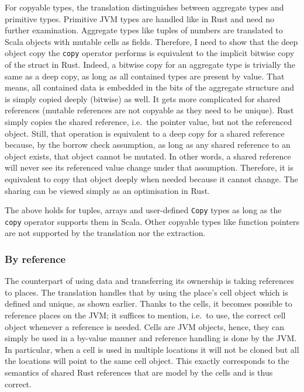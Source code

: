 For copyable types, the translation distinguishes between aggregate types and
primitive types. Primitive JVM types are handled like in Rust and need no
further examination. Aggregate types like tuples of numbers are translated to
Scala objects with mutable cells as fields. Therefore, I need to show that the
deep object copy the \lstinline!copy! operator performs is equivalent to the
implicit bitwise copy of the struct in Rust. Indeed, a bitwise copy for an
aggregate type is trivially the same as a deep copy, as long as all contained
types are present by value. That means, all contained data is embedded in the
bits of the aggregate structure and is simply copied deeply (bitwise) as well.
It gets more complicated for shared references (mutable references are not
copyable as they need to be unique). Rust simply copies the shared reference,
i.e.~the pointer value, but not the referenced object. Still, that operation is
equivalent to a deep copy for a shared reference because, by the borrow check
assumption, as long as any shared reference to an object exists, that object
cannot be mutated. In other words, a shared reference will never see its
referenced value change under that assumption. Therefore, it is equivalent to
copy that object deeply when needed because it cannot change. The sharing can be
viewed simply as an optimisation in Rust.

The above holds for tuples, arrays and user-defined \lstinline!Copy! types as
long as the \lstinline!copy! operator supports them in Scala. Other copyable
types like function pointers are not supported by the translation nor the
extraction.

\subsubsection{By reference}

The counterpart of using data and transferring its ownership is taking
references to places. The translation handles that by using the place's cell
object which is defined and unique, as shown earlier. Thanks to the cells, it
becomes possible to reference places on the JVM; it suffices to mention, i.e.~to
use, the correct cell object whenever a reference is needed. Cells are JVM
objects, hence, they can simply be used in a by-value manner and reference
handling is done by the JVM. In particular, when a cell is used in multiple
locations it will not be cloned but all the locations will point to the same
cell object. This exactly corresponds to the semantics of shared Rust references
that are model by the cells and is thus correct.

